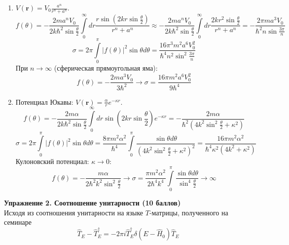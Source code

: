 \documentclass[12pt]{article}
\theoremstyle{definition}
\begin{document}
\begin{enumerate}
\item $V(\textbf{r}) = V_0\frac{a^n}{r^n+a^n}$.
\begin{equation}
    f(\theta)=-\frac{2ma^nV_0}{2k\hbar^2\sin\frac{\theta}{2}}\int\limits_0^\infty dr\frac{r\sin\left(2kr\sin\frac{\theta}{2}\right)}{r^n+a^n}\approx-\frac{2ma^nV_0}{2k\hbar^2\sin\frac{\theta}{2}}\int\limits_0^\infty dr\frac{2kr^2\sin\frac{\theta}{2}}{r^n+a^n}=-\frac{2\pi ma^3V_0}{\hbar^2n\sin\frac{3\pi}{n}}
\end{equation}
\begin{equation}
    \boxed{\sigma=2\pi\int\limits_0^\pi|f(\theta)|^2\sin\theta d\theta=\frac{16\pi^3m^2a^6V^2_0}{\hbar^4n^2\sin^2\frac{3\pi}{n}}}
\end{equation}
При $n\rightarrow\infty$ (сферическая прямоугольная яма):
\begin{equation}
    f(\theta)=-\frac{2ma^3V_0}{3\hbar^2}\rightarrow\boxed{\sigma=\frac{16\pi m^2a^6V^2_0}{9\hbar^4}}
\end{equation}
\item Потенциал Юкавы: $V(\textbf{r}) = \frac{\alpha}{r}e^{-\kappa r}$.
\begin{equation}
    f(\theta)=-\frac{2m\alpha}{2k\hbar^2\sin\frac{\theta}{2}}\int\limits_0^\infty dr\sin\left(2kr\sin\frac{\theta}{2}\right)e^{-\kappa r}=-\frac{2m\alpha}{\hbar^2(4k^2\sin^2\frac{\theta}{2}+\kappa^2)}
\end{equation}
\begin{equation}
    \boxed{\sigma=2\pi\int\limits_0^\pi|f(\theta)|^2\sin\theta d\theta=\frac{8\pi m^2\alpha^2}{\hbar^4}\int\limits_0^\pi\frac{\sin\theta d\theta}{(4k^2\sin^2\frac{\theta}{2}+\kappa^2)^2}=\frac{16\pi m^2\alpha^2}{\hbar^4\kappa^2(4k^2+\kappa^2)}}
\end{equation}
Кулоновский потенциал: $\kappa\rightarrow0$:
\begin{equation}
    f(\theta)=-\frac{m\alpha}{2\hbar^2k^2\sin^2\frac{\theta}{2}}\rightarrow\boxed{\sigma=\frac{\pi m^2\alpha^2}{2\hbar^4k^4}\int\limits_0^\pi\frac{\sin\theta d\theta}{\sin^4\frac{\theta}{2}}\rightarrow\infty}
\end{equation}
\end{enumerate}
\textbf{Упражнение 2. Соотношение унитарности (10 баллов)}\\
Исходя из соотношения унитарности на языке $T$-матрицы, полученного на семинаре
\begin{equation}
    \hat{T}_E-\hat{T}^\dagger_E = -2\pi i\hat{T}^\dagger_E\delta(E - \hat{H}_0)\hat{T}_E
\end{equation}
\end{document}
